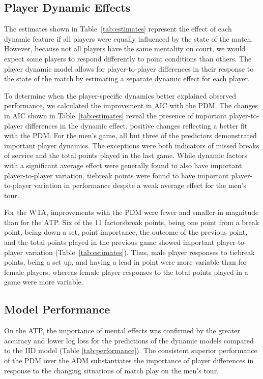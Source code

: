 \documentclass{Latex/svjour3}
\begin{document}
\subsection{Player Dynamic Effects}


The estimates shown in Table~\ref{tab:estimates} represent the effect of each dynamic feature if all players were equally
influenced by the state of the match. However, because not all players
have the same mentality on court, we would expect some players to respond differently to point conditions than others. The player dynamic
model allows for player-to-player differences in their response to the
state of the match by
estimating a separate dynamic effect for each player. 

To determine
when the player-specific dynamics better explained observed
performance, we calculated the improvement in AIC with the PDM. The changes in
AIC shown in Table~\ref{tab:estimates} reveal the presence of
important player-to-player differences in the dynamic effect, positive
changes reflecting a better fit with the PDM. For the men's game, all but three of the predictors demonstrated
important player dynamics. The exceptions were both indicators of missed
breaks of service and the total points played in the last game. While
dynamic factors with a significant average effect were generally found
to also have important player-to-player variation, tiebreak points
were found to have important player-to-player variation in performance
despite a weak average effect for the men's tour. 

For the WTA, improvements with the PDM were fewer and smaller in
magnitude than for the ATP. Six of the 11 factors\textemdash break
points, being one point from a break point, being down a set, point
importance, the outcome of the previous point, and the total points
played in the previous game \textemdash showed important
player-to-player variation (Table~\ref{tab:estimates}). Thus, male
player responses to tiebreak points, being a set up, and having a lead
in point were more variable than for female players, whereas female
player responses to the total points played in a game were more variable. 

\subsection{Model Performance}

On the ATP, the importance of mental effects
was confirmed by the greater accuracy and lower log loss for the
predictions of the dynamic models compared to the IID model (Table
\ref{tab:performance}). The consistent superior performance of the PDM
over the ADM substantiates the importance of player differences in
response to the changing situations of match play on the men's tour.
\end{document}
